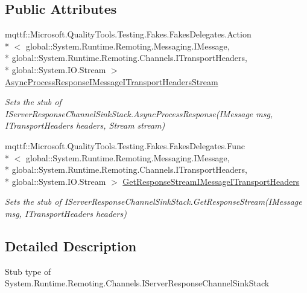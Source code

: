 \subsection*{Public Attributes}
\begin{DoxyCompactItemize}
\item 
mqttf\-::\-Microsoft.\-Quality\-Tools.\-Testing.\-Fakes.\-Fakes\-Delegates.\-Action\\*
$<$ global\-::\-System.\-Runtime.\-Remoting.\-Messaging.\-I\-Message, \\*
global\-::\-System.\-Runtime.\-Remoting.\-Channels.\-I\-Transport\-Headers, \\*
global\-::\-System.\-I\-O.\-Stream $>$ \hyperlink{class_system_1_1_runtime_1_1_remoting_1_1_channels_1_1_fakes_1_1_stub_i_server_response_channel_sink_stack_a6b2e61d70fb9159221032e01b8dc911c}{Async\-Process\-Response\-I\-Message\-I\-Transport\-Headers\-Stream}
\begin{DoxyCompactList}\small\item\em Sets the stub of I\-Server\-Response\-Channel\-Sink\-Stack.\-Async\-Process\-Response(\-I\-Message msg, I\-Transport\-Headers headers, Stream stream)\end{DoxyCompactList}\item 
mqttf\-::\-Microsoft.\-Quality\-Tools.\-Testing.\-Fakes.\-Fakes\-Delegates.\-Func\\*
$<$ global\-::\-System.\-Runtime.\-Remoting.\-Messaging.\-I\-Message, \\*
global\-::\-System.\-Runtime.\-Remoting.\-Channels.\-I\-Transport\-Headers, \\*
global\-::\-System.\-I\-O.\-Stream $>$ \hyperlink{class_system_1_1_runtime_1_1_remoting_1_1_channels_1_1_fakes_1_1_stub_i_server_response_channel_sink_stack_a4f26034e5eb5342ef986c1d4ad510957}{Get\-Response\-Stream\-I\-Message\-I\-Transport\-Headers}
\begin{DoxyCompactList}\small\item\em Sets the stub of I\-Server\-Response\-Channel\-Sink\-Stack.\-Get\-Response\-Stream(\-I\-Message msg, I\-Transport\-Headers headers)\end{DoxyCompactList}\end{DoxyCompactItemize}


\subsection{Detailed Description}
Stub type of System.\-Runtime.\-Remoting.\-Channels.\-I\-Server\-Response\-Channel\-Sink\-Stack



